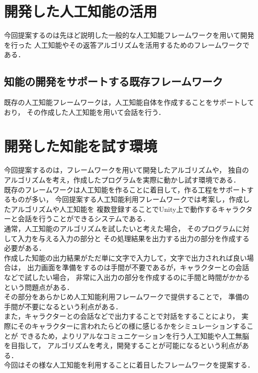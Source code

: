 \section{開発した人工知能の活用}
今回提案するのは先ほど説明した一般的な人工知能フレームワークを用いて開発を行った
人工知能やその返答アルゴリズムを活用するためのフレームワークである．
\subsection{知能の開発をサポートする既存フレームワーク}
既存の人工知能フレームワークは，人工知能自体を作成することをサポートしており，
その作成した人工知能を用いて会話を行う．\\
\section{開発した知能を試す環境}
今回提案するのは，フレームワークを用いて開発したアルゴリズムや，
独自のアルゴリズムを考え，作成したプログラムを実際に動かし試す環境である．
\\
既存のフレームワークは人工知能を作ることに着目して，作る工程をサポートするものが多い，
今回提案する人工知能利用フレームワークでは考案し，作成したアルゴリズムや人工知能を
複数登録することでUnity上で動作するキャラクターと会話を行うことができるシステムである．
\\
通常，人工知能のアルゴリズムを試したいと考えた場合，
そのプログラムに対して入力を与える入力の部分と
その処理結果を出力する出力の部分を作成する必要がある．
\\
作成した知能の出力結果がただ単に文字で入力して，文字で出力されれば良い場合は，
出力画面を準備をするのは手間が不要であるが，キャラクターとの会話などで試したい場合，
非常に入出力の部分を作成するのに手間と時間がかかるという問題点がある．
\\
その部分をあらかじめ人工知能利用フレームワークで提供することで，
準備の手間が不要になるという利点がある．
\\
また，キャラクターとの会話などで出力することで対話をすることにより，
実際にそのキャラクターに言われたらどの様に感じるかをシミュレーションすることが
できるため，よりリアルなコミュニケーションを行う人工知能や人工無脳を目指して，
アルゴリズムを考え，開発することが可能になるという利点がある．
\\
今回はその様な人工知能を利用することに着目したフレームワークを提案する．
